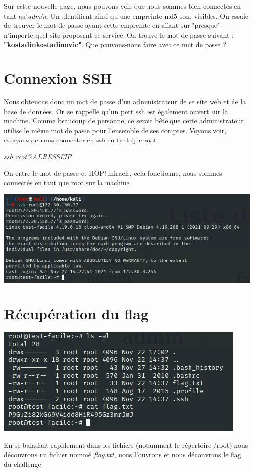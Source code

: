 \documentclass{article}
\begin{document}
Sur cette nouvelle page, nous pouvons voir que nous sommes bien connectés en tant qu'\textit{admin}. Un identifiant ainsi qu'une empreinte md5 sont visibles. On essaie de trouver le mot de passe ayant cette empreinte en allant sur "presque" n'importe quel site proposant ce service. On trouve le mot de passe suivant : \textbf{\hbox{"kostadinkostadinovic"}}. Que pouvons-nous faire avec ce mot de passe ? 

\section{Connexion SSH}
Nous obtenons donc un mot de passe d'un administrateur de ce site web et de la base de données. On se rappelle qu'un port ssh est également ouvert sur la machine. Comme beaucoup de personne, ce serait bête que cette administrateur utilise le même mot de passe pour l'ensemble de ses comptes. Voyons voir, essayons de nous connecter en ssh en tant que root. 

\begin{center}
    \textit{ssh root@ADRESSEIP}\newline
\end{center}

On entre le mot de passe et HOP! miracle, cela fonctionne, nous sommes connectés en tant que root sur la machine.\\

\centerline{\includegraphics[scale=0.5]{img/ssh_login.png}}

\section{Récupération du flag}
\begin{minipage}{0.55\linewidth}
\includegraphics[scale=0.5]{img/flag.png}
\end{minipage}\hfill
\begin{minipage}{0.4\linewidth}
En se baladant rapidement dans les fichiers (notamment le répertoire /root) nous découvrons un fichier nommé \textit{flag.txt}, nous l'ouvrons et nous découvrons le flag du challenge.
\end{minipage}
\end{document}
